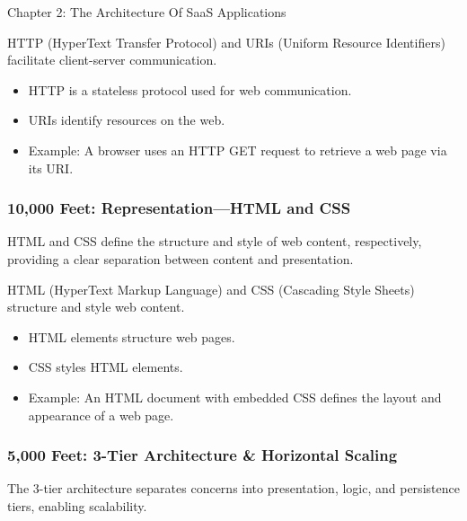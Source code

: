 \begin{notes}{Chapter 2: The Architecture Of SaaS Applications}
\begin{highlight}
        HTTP (HyperText Transfer Protocol) and URIs (Uniform Resource Identifiers) facilitate client-server communication.
        
        \begin{itemize}
            \item HTTP is a stateless protocol used for web communication.
            \item URIs identify resources on the web.
            \item Example: A browser uses an HTTP GET request to retrieve a web page via its URI.
        \end{itemize}
    
    \end{highlight}
    
    \subsubsection*{10,000 Feet: Representation—HTML and CSS}
    
    HTML and CSS define the structure and style of web content, respectively, providing a clear separation between content and presentation.
    
    \begin{highlight}
    
        HTML (HyperText Markup Language) and CSS (Cascading Style Sheets) structure and style web content.
        
        \begin{itemize}
            \item HTML elements structure web pages.
            \item CSS styles HTML elements.
            \item Example: An HTML document with embedded CSS defines the layout and appearance of a web page.
        \end{itemize}
    
    \end{highlight}
    
    \subsubsection*{5,000 Feet: 3-Tier Architecture & Horizontal Scaling}
    
    The 3-tier architecture separates concerns into presentation, logic, and persistence tiers, enabling scalability.
    
    \begin{highlight}
    

\end{highlight}
\end{notes}
